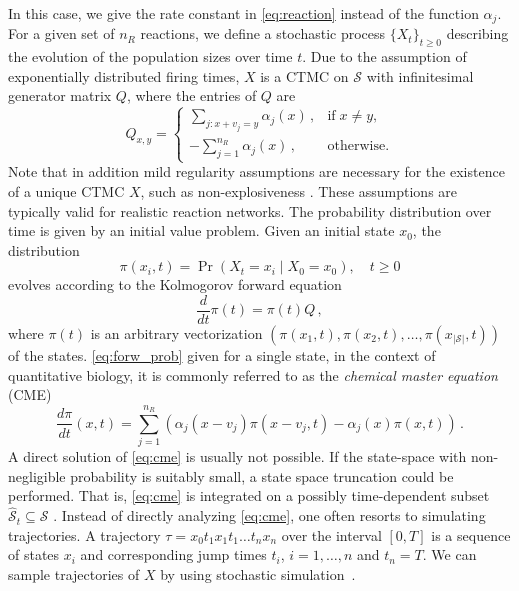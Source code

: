 In this case, we give the rate constant in \eqref{eq:reaction} instead of the function $\alpha_j$.
For a given set of $n_R$ reactions, we define a stochastic
process $\{{{X}}_t\}_{t\geq 0}$ describing the evolution of the population
sizes over time $t$.
Due to the assumption of exponentially distributed firing times,  $ X$ is
a \ac{CTMC} on $\mathcal{S}$ with infinitesimal  generator matrix $Q$, where
the entries of $Q$ are
\begin{equation}\label{eq:cme_generator}
    Q_{ x,  y} = \begin{cases}
        \sum_{j: x+ v_j = y}\alpha_j( x)\,,&\text{if}\; x\neq
         y,\\[1ex]
        -\sum_{j=1}^{n_R} \alpha_j( x)\,, &\text{otherwise.}
    \end{cases}
\end{equation}
Note that in addition mild regularity assumptions
are   necessary for the existence of a unique \ac{CTMC} $X$, such as non-explosiveness \cite{anderson2012continuous}.
These assumptions  are  typically
valid for realistic reaction networks.
The probability distribution over time is given by an
initial value problem.
Given an initial state $x_0$, the distribution
\begin{equation}\label{eq:forw_prob}
\pi(x_i, t)=\Pr(X_t=x_i\mid X_0=x_0),\quad t\geq 0
\end{equation}
evolves according to the Kolmogorov forward equation
\begin{equation}\label{eq:forward}
\frac{d}{dt}\pi(t) = \pi(t) Q\,,
\end{equation}
where $\pi(t)$ is an arbitrary vectorization $(\pi(x_1,t), \pi(x_2,t),\dots,\pi(x_{|\mathcal{S}|},t))$ of the states.
\eqref{eq:forw_prob} given for a single state, in the context of quantitative biology, it is commonly referred to
as the \emph{chemical master equation} (CME)
\begin{equation}\label{eq:cme}
    \frac{d\pi}{d t} ( x,t) =
    \sum_{j=1}^{n_R}\left(
        \alpha_j( x- v_j)\pi( x- v_j,t) - \alpha_j( x)\pi( x,t)
    \right)\,.
\end{equation}
A direct solution of \eqref{eq:cme} is usually not possible.
If the state-space with non-negligible probability is suitably small, a state space
truncation could be performed. That is, \eqref{eq:cme} is integrated on a possibly time-dependent subset
$\hat{\mathcal{S}}_t\subseteq\mathcal{S}$ \cite{henzinger2009sliding,munsky2006finite,spieler2014numerical}.
Instead of directly analyzing \eqref{eq:cme}, one often resorts to simulating trajectories.
A trajectory $\tau=x_0t_1x_1t_1\dots t_n x_n$ over the interval $[0,T]$ is a sequence of states $x_i$
and corresponding
jump times $t_i$, $i=1,\dots,n$ and $t_n=T$.
We can sample trajectories of $X$ by using stochastic simulation~\cite{gillespie1977exact}.

